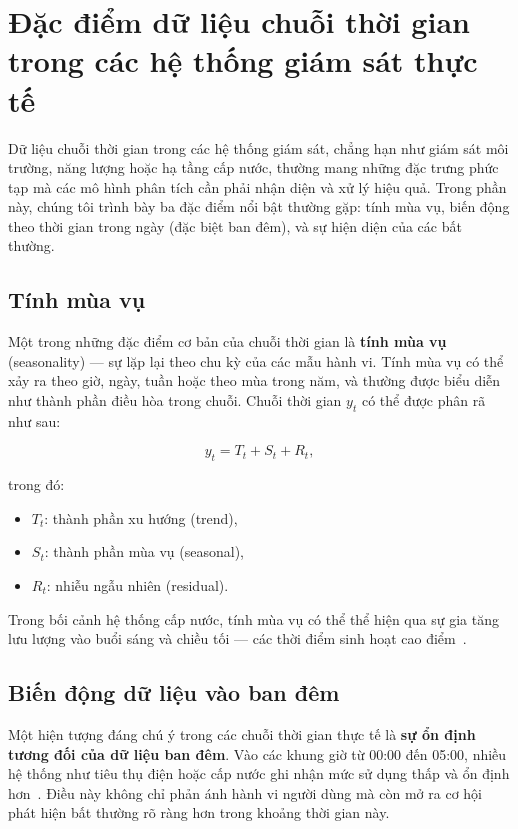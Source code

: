 \section{Đặc điểm dữ liệu chuỗi thời gian trong các hệ thống giám sát thực tế}

Dữ liệu chuỗi thời gian trong các hệ thống giám sát, chẳng hạn như giám sát môi trường, năng lượng hoặc hạ tầng cấp nước, thường mang những đặc trưng phức tạp mà các mô hình phân tích cần phải nhận diện và xử lý hiệu quả. Trong phần này, chúng tôi trình bày ba đặc điểm nổi bật thường gặp: tính mùa vụ, biến động theo thời gian trong ngày (đặc biệt ban đêm), và sự hiện diện của các bất thường.

\subsection{Tính mùa vụ}

Một trong những đặc điểm cơ bản của chuỗi thời gian là \textbf{tính mùa vụ} (seasonality) --- sự lặp lại theo chu kỳ của các mẫu hành vi. Tính mùa vụ có thể xảy ra theo giờ, ngày, tuần hoặc theo mùa trong năm, và thường được biểu diễn như thành phần điều hòa trong chuỗi. Chuỗi thời gian \( y_t \) có thể được phân rã như sau:

\begin{equation}
    y_t = T_t + S_t + R_t,
\end{equation}

trong đó:
\begin{itemize}
    \item \( T_t \): thành phần xu hướng (trend),
    \item \( S_t \): thành phần mùa vụ (seasonal),
    \item \( R_t \): nhiễu ngẫu nhiên (residual).
\end{itemize}

Trong bối cảnh hệ thống cấp nước, tính mùa vụ có thể thể hiện qua sự gia tăng lưu lượng vào buổi sáng và chiều tối --- các thời điểm sinh hoạt cao điểm~\cite{zhou2000pattern, yang2019urban}.

\subsection{Biến động dữ liệu vào ban đêm}

Một hiện tượng đáng chú ý trong các chuỗi thời gian thực tế là \textbf{sự ổn định tương đối của dữ liệu ban đêm}. Vào các khung giờ từ 00:00 đến 05:00, nhiều hệ thống như tiêu thụ điện hoặc cấp nước ghi nhận mức sử dụng thấp và ổn định hơn~\cite{ratnam2020real}. Điều này không chỉ phản ánh hành vi người dùng mà còn mở ra cơ hội phát hiện bất thường rõ ràng hơn trong khoảng thời gian này.

